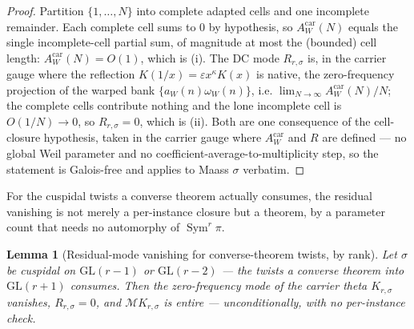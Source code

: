 \documentclass[11pt]{article}
\newtheorem{lemma}[theorem]{Lemma}
\theoremstyle{definition}
\newcommand{\Sym}{\operatorname{Sym}}
\begin{document}
\begin{proof}
Partition $\{1,\dots,N\}$ into complete adapted cells and one incomplete remainder. Each complete cell sums
to $0$ by hypothesis, so $A^{\mathrm{car}}_W(N)$ equals the single incomplete-cell partial sum, of magnitude
at most the (bounded) cell length: $A^{\mathrm{car}}_W(N)=O(1)$, which is \textup{(i)}. The DC mode
$R_{r,\sigma}$ is, in the carrier gauge where the reflection $K(1/x)=\varepsilon x^{\kappa}K(x)$ is native,
the zero-frequency projection of the warped bank $\{a_W(n)\omega_W(n)\}$, i.e.
$\lim_{N\to\infty}A^{\mathrm{car}}_W(N)/N$; the complete cells contribute nothing and the lone incomplete
cell is $O(1/N)\to0$, so $R_{r,\sigma}=0$, which is \textup{(ii)}. Both are one consequence of the
cell-closure hypothesis, taken in the carrier gauge where $A^{\mathrm{car}}_W$ and $R$ are defined --- no
global Weil parameter and no coefficient-average-to-multiplicity step, so the statement is Galois-free and
applies to Maass $\sigma$ verbatim.
\end{proof}

For the cuspidal twists a converse theorem actually consumes, the residual vanishing is not merely a
per-instance closure but a theorem, by a parameter count that needs no automorphy of $\Sym^r\pi$.

\begin{lemma}[Residual-mode vanishing for converse-theorem twists, by rank]\label{lem:rankgap}
Let $\sigma$ be cuspidal on $\mathrm{GL}(r-1)$ or $\mathrm{GL}(r-2)$ --- the twists a converse theorem into
$\mathrm{GL}(r+1)$ consumes. Then the zero-frequency mode of the carrier theta $K_{r,\sigma}$ vanishes,
$R_{r,\sigma}=0$, and $\mathcal M K_{r,\sigma}$ is entire --- unconditionally, with no per-instance check.
\end{lemma}
\end{document}
